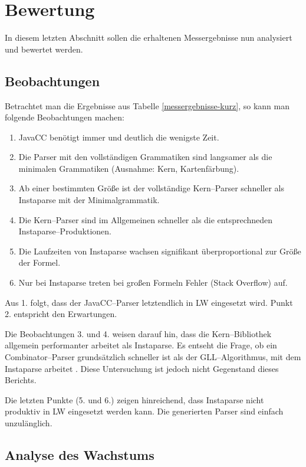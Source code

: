 \documentclass[ngerman,a4paper,abstracton,open=right,twoside=false,toc=listofnumbered,bibtotocnumbered]{scrreprt}
\begin{document}
\chapter{Bewertung}

In diesem letzten Abschnitt sollen die erhaltenen Messergebnisse nun analysiert und bewertet werden.

\section{Beobachtungen}

Betrachtet man die Ergebnisse aus Tabelle \ref{messergebnisse-kurz}, so kann man folgende Beobachtungen machen:

\begin{enumerate}
	\item JavaCC benötigt immer und deutlich die wenigste Zeit.
	\item Die Parser mit den vollständigen Grammatiken sind langsamer als die minimalen Grammatiken (Ausnahme: Kern, Kartenfärbung).
	\item Ab einer bestimmten Größe ist der vollständige Kern--Parser schneller als Instaparse mit der Minimalgrammatik.
	\item Die Kern--Parser sind im Allgemeinen schneller als die entsprechneden Instaparse--Produktionen.
	\item Die Laufzeiten von Instaparse wachsen signifikant überproportional zur Größe der Formel.
	\item Nur bei Instaparse treten bei großen Formeln Fehler (Stack Overflow) auf.
\end{enumerate}

Aus 1. folgt, dass der JavaCC--Parser letztendlich in LW eingesetzt wird. Punkt 2. entspricht den Erwartungen.

Die Beobachtungen 3. und 4. weisen darauf hin, dass die Kern--Bibliothek allgemein performanter arbeitet als Instaparse. Es entseht die Frage, ob ein Combinator--Parser grundsätzlich schneller ist als der GLL--Algorithmus, mit dem Instaparse arbeitet \cite[Special Thanks]{instaparse}. Diese Untersuchung ist jedoch nicht Gegenstand dieses Berichts.

Die letzten Punkte (5. und 6.) zeigen hinreichend, dass Instaparse nicht produktiv in LW eingesetzt werden kann. Die generierten Parser sind einfach unzulänglich.

\section{Analyse des Wachstums}
\end{document}
